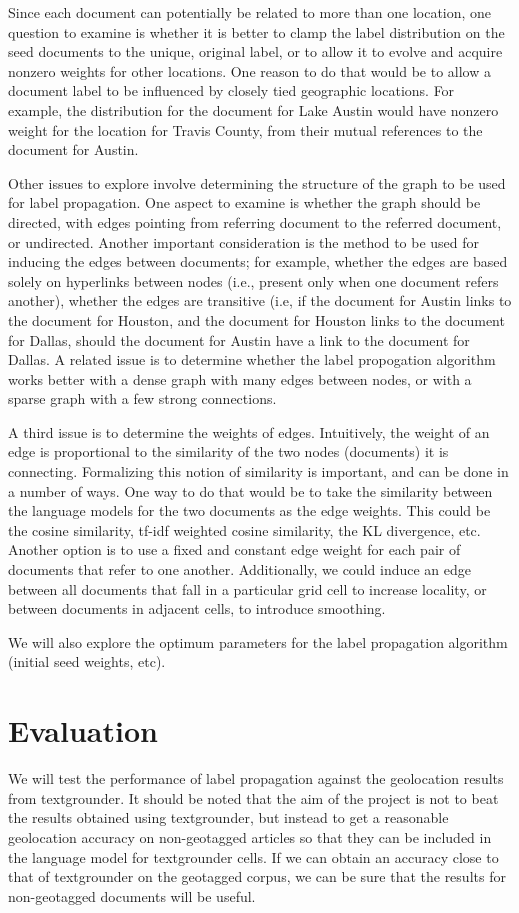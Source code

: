\documentclass[11pt]{article}
\begin{document}
Since each document can potentially be related to more than one location, one question to examine is whether 
it is better to clamp the label distribution on the seed documents to the unique, original label, or to allow it to evolve and acquire nonzero weights for other locations.
One reason to do that would be to allow a document label to be influenced by closely tied geographic locations. For example, the distribution for the document for 
Lake Austin would have nonzero weight for the location for Travis County, from their mutual references to the document for Austin.


Other issues to explore involve determining the structure of the graph to be used for label propagation. One aspect to examine is whether the graph 
should be directed, with edges pointing from referring document to the referred document, or undirected. Another important consideration is the method to be used
for inducing the edges between documents; for example, whether the edges are based solely on hyperlinks between nodes (i.e., present only when one document
refers another), whether the edges are transitive (i.e, if the document for Austin links to the document for Houston, and the document for Houston links to the document for Dallas, 
should the document for Austin have a link to the document for Dallas. A related issue is to determine whether the label propogation algorithm works better with a dense graph 
with many edges between nodes, or with a sparse graph with a few strong connections.
  
A third issue is to determine the weights of edges. Intuitively, the weight of an edge is proportional to the similarity of the two nodes (documents) it is connecting. 
Formalizing this notion of similarity is important, and can be done in a number of ways. One way to do that would be to take the 
similarity between the language models for the two documents as the edge weights. This could be the cosine similarity, tf-idf weighted cosine similarity, the KL divergence, etc.
Another option is to use a fixed and constant edge weight for each pair of documents that refer to one another. Additionally, we could induce an edge between all documents 
that fall in a particular grid cell to increase locality, or between documents in adjacent cells, to introduce smoothing.
 
We will also explore the optimum parameters for the label propagation algorithm (initial seed weights, etc).

\section{Evaluation}
We will test the performance of label propagation against the geolocation results from textgrounder. 
It should be noted that the aim of the project is not to beat the results obtained using textgrounder,
but instead to get a reasonable geolocation accuracy on non-geotagged articles 
so that they can be included in the language model for textgrounder cells. 
If we can obtain an accuracy close to that of textgrounder on the geotagged corpus, 
we can be sure that the results for non-geotagged documents will be useful.
\end{document}
